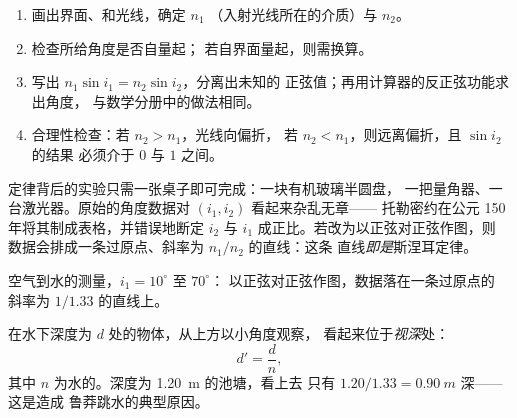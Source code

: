 \begin{method}[解折射问题的方法]\label{met:g10:refraction:method}
\begin{enumerate}
  \item 画出界面、和光线，确定 $n_1$
        （入射光线所在的介质）与 $n_2$。
  \item 检查所给角度是否自量起；
        若自界面量起，则需换算。
  \item 写出 $n_1 \sin i_1 = n_2 \sin i_2$，分离出未知的
        正弦值；再用计算器的反正弦功能求出角度，
        与数学分册中的做法相同。
  \item 合理性检查：若 $n_2 > n_1$，光线向偏折，
        若 $n_2 < n_1$，则远离偏折，且 $\sin i_2$ 的结果
        必须介于 $0$ 与 $1$ 之间。
\end{enumerate}
\end{method}

定律背后的实验只需一张桌子即可完成：一块有机玻璃半圆盘，
一把量角器、一台激光器。原始的角度数据对 $(i_1, i_2)$ 看起来杂乱无章——
托勒密约在公元 150 年将其制成表格，并错误地断定
$i_2$ 与 $i_1$ 成正比。若改为以正弦对正弦作图，则
数据会排成一条过原点、斜率为 $n_1/n_2$ 的直线：这条
直线\emph{即是}斯涅耳定律。

\begin{omfigure}

{\small 空气到水的测量，$i_1 = 10^\circ$ 至 $70^\circ$：
以正弦对正弦作图，数据落在一条过原点的
斜率为 $1/1.33$ 的直线上。}
\end{omfigure}

\begin{proposition}[视深]\label{prop:g10:refraction:depth}
在水下深度为 $d$ 处的物体，从上方以小角度观察，
看起来位于\emph{视深}处：
\[
d' = \frac{d}{n} ,
\]
其中 $n$ 为水的。深度为 \qty{1.20}{m} 的池塘，看上去
只有 $1.20/1.33 = \qty{0.90}{m}$ 深——这是造成
鲁莽跳水的典型原因。
\end{proposition}
\admitted

